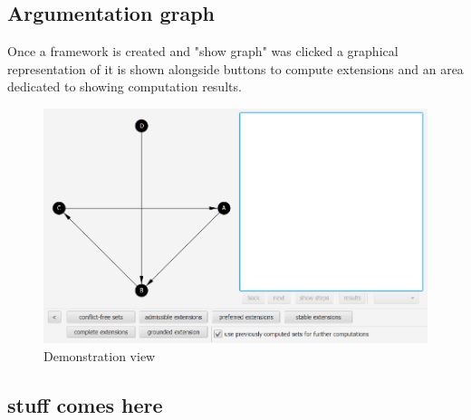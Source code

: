 \documentclass{article}
\begin{document}
\subsection{Argumentation graph}
Once a framework is created and "show graph" was clicked a graphical representation of it is shown alongside buttons to compute extensions and an area dedicated to showing computation results.

\FloatBarrier
	\begin{figure}[!htb]
		\includegraphics[width=\linewidth]{pics/demo.png}
		\caption{Demonstration view}
	\end{figure}
\FloatBarrier

\subsection{stuff comes here}
\end{document}
